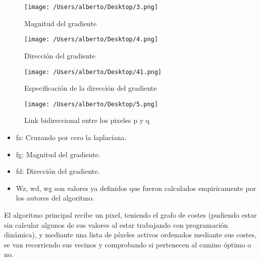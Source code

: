 \begin{figure}[H] %
\centering
\texttt{[image: /Users/alberto/Desktop/3.png]}  %
\label{kk1}
\caption{Magnitud del gradiente} 
\end{figure}

\begin{figure}[H] %
\centering
\texttt{[image: /Users/alberto/Desktop/4.png]}  %
\label{kk1}
\caption{Dirección del gradiente} 
\end{figure}

\begin{figure}[H] %
\centering
\texttt{[image: /Users/alberto/Desktop/41.png]}  %
\label{kk1}
\caption{Especificación de la dirección del gradiente} 
\end{figure}

\begin{figure}[H] %
\centering
\texttt{[image: /Users/alberto/Desktop/5.png]}  %
\label{kk1}
\caption{Link bidireccional entre los pixeles p y q} 
\end{figure}

\begin{itemize}
\item fz: Cruzando por cero la laplaciana.
\item fg: Magnitud del gradiente.
\item fd: Dirección del gradiente.
\item Wz, wd, wg son valores ya definidos que fueron calculados empiricamente por los autores del algoritmo.
\end{itemize}

El algoritmo principal recibe un pixel, teniendo el grafo de costes (pudiendo estar sin calcular algunos de sus valores al estar trabajando con programación dinámica), y mediante una lista de píxeles activos ordenados mediante sus costes, se van recorriendo sus vecinos y comprobando si pertenecen al camino óptimo o no.


